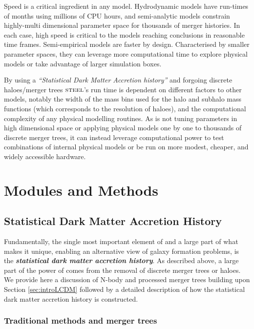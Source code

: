 Speed is a critical ingredient in any model. Hydrodynamic models have run-times of months using millions of CPU hours, and semi-analytic models constrain highly-multi dimensional parameter space for thousands of merger histories. In each case, high speed is critical to the models reaching conclusions in reasonable time frames. Semi-empirical models are faster by design. Characterised by smaller parameter spaces, they can leverage more computational time to explore physical models or take advantage of larger simulation boxes. 

By using a \textit{``Statistical Dark Matter Accretion history''} and forgoing discrete haloes/merger trees $\textsc{steel}$'s run time is dependent on different factors to other models, notably the width of the mass bins used for the halo and subhalo mass functions (which corresponds to the resolution of haloes), and the computational complexity of any physical modelling routines. As \steel is not tuning parameters in high dimensional space or applying physical models one by one to thousands of discrete merger trees, it can instead leverage computational power to test combinations of internal physical models or be run on more modest, cheaper, and widely accessible hardware. 

\section{Modules and Methods}

\subsection{Statistical Dark Matter Accretion History}
\label{subsec:SDMAH}

Fundamentally, the single most important element of \steel and a large part of what makes it unique, enabling an alternative view of galaxy formation problems, is the \textbf{\textit{statistical dark matter accretion history}}. As described above, a large part of the power of \steel comes from the removal of discrete merger trees or haloes. We provide here a discussion of N-body and processed merger trees building upon Section \ref{sec:introLCDM} followed by a detailed description of how the statistical dark matter accretion history is constructed.

\subsubsection{Traditional methods and merger trees}

